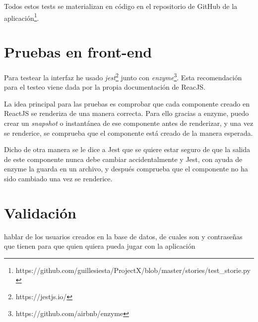 Todos estos tests se materializan en código en el repositorio de GitHub de la aplicación\footnote{https://github.com/guillesiesta/ProjectX/blob/master/stories/test\_storie.py}. 

\section{Pruebas en front-end}

Para testear la interfaz he usado \textit{jest}\footnote{https://jestjs.io/} junto con \textit{enzyme}\footnote{https://github.com/airbnb/enzyme}. Esta recomendación para el testeo viene dada por la propia documentación de ReacJS\cite{testreact}.

La idea principal para las pruebas es comprobar que cada componente creado en ReactJS se renderiza de una manera correcta. Para ello gracias a enzyme, puedo crear un \textit{snapshot} o instantánea de ese componente antes de renderizar, y una vez se renderice, se comprueba que el componente está creado de la manera esperada\cite{testreact2}.

Dicho de otra manera se le dice a Jest que se quiere estar seguro de que la salida de este componente nunca debe cambiar accidentalmente y Jest, con ayuda de enzyme la guarda en un archivo, y después comprueba que el componente no ha sido cambiado una vez se renderice.

\section{Validación}

hablar de los usuarios creados en la base de datos, de cuales son y contraseñas que tienen para que quien quiera pueda jugar con la aplicación